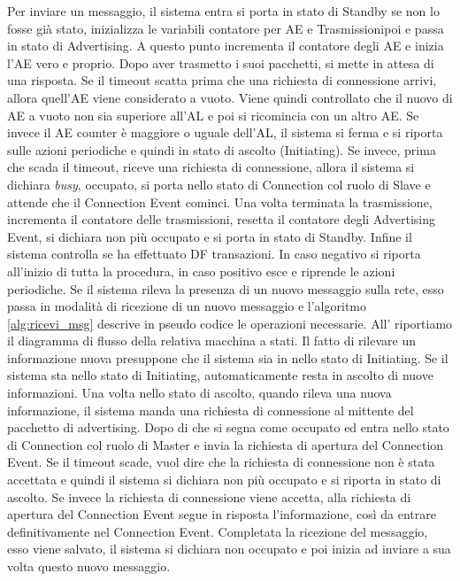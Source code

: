 Per inviare un messaggio, il sistema entra si porta in stato di Standby se non lo fosse già stato, inizializza le variabili contatore per \acf{AE} e Trasmissionipoi e passa in stato di Advertising. A questo punto incrementa il contatore degli \acl{AE} e inizia l'\acs{AE} vero e proprio. Dopo aver trasmetto i suoi pacchetti, si mette in attesa di una risposta. Se il timeout scatta prima che una richiesta di connessione arrivi, allora quell'AE viene considerato a vuoto. Viene quindi controllato che il nuovo di AE a vuoto non sia superiore all'AL e poi si ricomincia con un altro AE. Se invece il AE counter è maggiore o uguale dell'AL, il sistema si ferma e si riporta sulle azioni periodiche e quindi in stato di ascolto (Initiating). Se invece, prima che scada il timeout, riceve una richiesta di connessione, allora il sistema si dichiara \textit{busy}, occupato, si porta nello stato di Connection col ruolo di Slave e attende che il Connection Event cominci. Una volta terminata la trasmissione, incrementa il contatore delle trasmissioni, resetta il contatore degli Advertising Event, si dichiara non più occupato e si porta in stato di Standby. Infine il sistema controlla se ha effettuato DF transazioni. In caso negativo si riporta all'inizio di tutta la procedura, in caso positivo esce e riprende le azioni periodiche.
Se il sistema rileva la presenza di un nuovo messaggio sulla rete, esso passa in modalità di ricezione di un nuovo messaggio e l'algoritmo \ref{alg:ricevi_msg} descrive in pseudo codice le operazioni necessarie. All' riportiamo il diagramma di flusso della relativa macchina a stati. Il fatto di rilevare un informazione nuova presuppone che il sistema sia in nello stato di Initiating. Se il sistema sta nello stato di Initiating, automaticamente resta in ascolto di nuove informazioni. Una volta nello stato di ascolto, quando rileva una nuova informazione, il sistema manda una richiesta di connessione al mittente del pacchetto di advertising. Dopo di che si segna come occupato ed entra nello stato di Connection col ruolo di Master e invia la richiesta di apertura del Connection Event. Se il timeout scade, vuol dire che la richiesta di connessione non è stata accettata e quindi il sistema si dichiara non più occupato e si riporta in stato di ascolto. Se invece la richiesta di connessione viene accetta, alla richiesta di apertura del Connection Event segue in risposta l'informazione, così da entrare definitivamente nel Connection Event. Completata la ricezione del messaggio, esso viene salvato, il sistema si dichiara non occupato e poi inizia ad inviare a sua volta questo nuovo messaggio.
